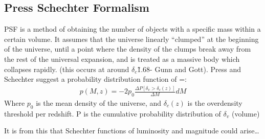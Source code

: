 	\subsection{Press Schechter Formalism} %
	\label{sub:press_schechter_formalism}
		PSF is a method of obtaining the number of objects with a specific mass within a certain volume. It assumes that the universe linearly ``clumped'' at the beginning of the universe, until a point where the density of the clumps break away from the rest of the universal expansion, and is treated as a massive body which collapses rapidly. (this occurs at around $\delta_c$\~1.68- Gunn and Gott). Press and Schechter suggest a probability distribution function of =:
		\begin{align}
		p(M,z)=-2p_0 \frac{\Delta P [\delta_v>\delta_c(z)]} {\Delta M} dM
		\end{align}
		Where $p_0$ is the mean density of the universe, and $\delta_c(z)$ is the overdensity threshold per redshift. P is the cumulative probability distribution of $\delta_v$ (volume)

		 It is from this that Schechter functions of luminosity and magnitude could arise\ldots

